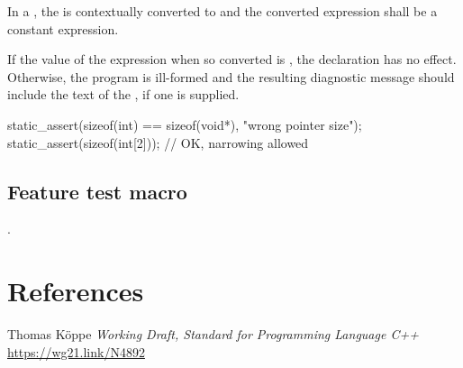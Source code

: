 \documentclass{wg21}
\begin{document}
In a ,
the 
is contextually converted to  and
the converted expression shall be a constant expression.


If the value of the expression  when
so converted is , the declaration has no
effect.
Otherwise, the program is ill-formed and the resulting
diagnostic message should include the text of
the , if one is supplied.


\begin{example}
\begin{codeblock}
    static_assert(sizeof(int) == sizeof(void*), "wrong pointer size");
    static_assert(sizeof(int[2]));          // OK, narrowing allowed
\end{codeblock}
\end{example}



\subsection{Feature test macro}

.

\section{References}

\renewcommand{\section}[2]{}%



\begin{thebibliography}{9}

Thomas Köppe
\emph{Working Draft, Standard for Programming Language C++}\newline
\url{https://wg21.link/N4892}


\end{thebibliography}
\end{document}
